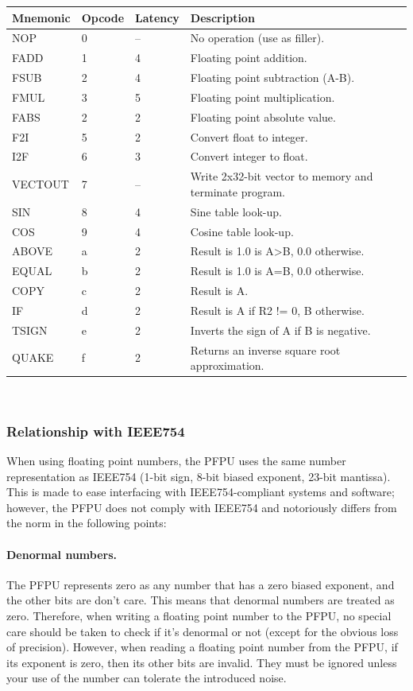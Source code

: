 \documentclass[a4paper,11pt]{article}
\begin{document}
\begin{tabularx}{\textwidth}{|l|l|l|l|X|}
\hline
\bf Mnemonic & \bf Opcode & \bf Latency & \bf Description \\
\hline
NOP & 0 & -- & No operation (use as filler). \\
\hline
FADD & 1 & 4 & Floating point addition. \\
\hline
FSUB & 2 & 4 & Floating point subtraction (A-B). \\
\hline
FMUL & 3 & 5 & Floating point multiplication. \\
\hline
FABS & 2 & 2 & Floating point absolute value. \\
\hline
F2I & 5 & 2 & Convert float to integer. \\
\hline
I2F & 6 & 3 & Convert integer to float. \\
\hline
VECTOUT & 7 & -- & Write 2x32-bit vector to memory and terminate program. \\
\hline
SIN & 8 & 4 & Sine table look-up. \\
\hline
COS & 9 & 4 & Cosine table look-up. \\
\hline
ABOVE & a & 2 & Result is 1.0 is A>B, 0.0 otherwise. \\
\hline
EQUAL & b & 2 & Result is 1.0 is A=B, 0.0 otherwise. \\
\hline
COPY & c & 2 & Result is A. \\
\hline
IF & d & 2 & Result is A if R2 != 0, B otherwise. \\
\hline
TSIGN & e & 2 & Inverts the sign of A if B is negative. \\
\hline
QUAKE & f & 2 & Returns an inverse square root approximation. \\
\hline
\end{tabularx}\\

\subsubsection{Relationship with IEEE754}
When using floating point numbers, the PFPU uses the same number representation as IEEE754 (1-bit sign, 8-bit biased exponent, 23-bit mantissa). This is made to ease interfacing with IEEE754-compliant systems and software; however, the PFPU does not comply with IEEE754 and notoriously differs from the norm in the following points:

\paragraph{Denormal numbers.} The PFPU represents zero as any number that has a zero biased exponent, and the other bits are don't care. This means that denormal numbers are treated as zero. Therefore, when writing a floating point number to the PFPU, no special care should be taken to check if it's denormal or not (except for the obvious loss of precision). However, when reading a floating point number from the PFPU, if its exponent is zero, then its other bits are invalid. They must be ignored unless your use of the number can tolerate the introduced noise.
\end{document}

